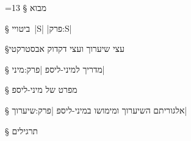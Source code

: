 \newcommand{\TopAlign}[1]{\adjustbox{valign=t}{#1}}

{%
    \makeatletter
    =13\relax%
    \gdef\fixNewLine{%
        \def^^M{\space}%
    }%
}
§ מבוא
%

§ ביטויי~\E|S|
|פרק:S|


§עצי שיערוך ועצי דקדוק אבסטרקטי
%

§ מדריך למיני-ליספ 
|פרק:מיני|
%

§ מפרט של מיני-ליספ
%

§ אלגוריתם השיערוך ומימושו במיני-ליספ 
%
|פרק:שיערוך|

§ תרגילים
%
